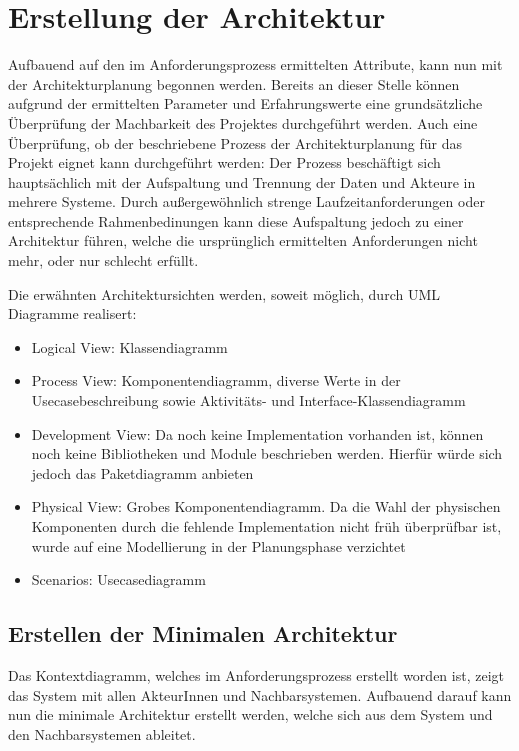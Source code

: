 \chapter{Erstellung der Architektur}
Aufbauend auf den im Anforderungsprozess ermittelten Attribute, kann nun mit der Architekturplanung begonnen werden. Bereits an dieser Stelle können aufgrund der ermittelten Parameter und Erfahrungswerte eine grundsätzliche Überprüfung der Machbarkeit des Projektes durchgeführt werden. Auch eine Überprüfung, ob der beschriebene Prozess der Architekturplanung für das Projekt eignet kann durchgeführt werden: Der Prozess beschäftigt sich hauptsächlich mit der Aufspaltung und Trennung der Daten und Akteure in mehrere Systeme. Durch außergewöhnlich strenge Laufzeitanforderungen oder entsprechende Rahmenbedinungen kann diese Aufspaltung jedoch zu einer Architektur führen, welche die ursprünglich ermittelten Anforderungen nicht mehr, oder nur schlecht erfüllt.

Die erwähnten Architektursichten werden, soweit möglich, durch UML Diagramme realisert:

\begin{itemize}
  \item Logical View: Klassendiagramm
  \item Process View: Komponentendiagramm, diverse Werte in der Usecasebeschreibung sowie Aktivitäts- und Interface-Klassendiagramm
  \item Development View: Da noch keine Implementation vorhanden ist, können noch keine Bibliotheken und Module beschrieben werden. Hierfür würde sich jedoch das Paketdiagramm anbieten
  \item Physical View: Grobes Komponentendiagramm. Da die Wahl der physischen Komponenten durch die fehlende Implementation nicht früh überprüfbar ist, wurde auf eine Modellierung in der Planungsphase verzichtet
  \item Scenarios: Usecasediagramm
\end{itemize}

\section{Erstellen der Minimalen Architektur}
Das Kontextdiagramm, welches im Anforderungsprozess erstellt worden ist, zeigt das System mit allen AkteurInnen und Nachbarsystemen. Aufbauend darauf kann nun die minimale Architektur erstellt werden, welche sich aus dem System und den Nachbarsystemen ableitet.

